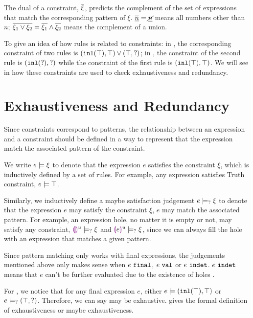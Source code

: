 \documentclass[acmsmall,screen,review,nonacm]{acmart}
\theoremstyle{slplain}
\numberwithin{thm}{section}
\begin{document}
The dual of a constraint, $\overline{\xi}$, predicts the complement of the set of expressions that match the corresponding pattern of $\xi$.
\eg $\overline{\underline{n}}=\underline{\cancel{n}}$ means all numbers other than $n$;
$\overline{\xi_1 \vee \xi_2}=\overline{\xi_1} \wedge \overline{\xi_2}$ means the complement of a union.

To give an idea of how rules is related to constraints:
in , the corresponding constraint of two rules is $(\mathtt{inl}(\top) , \top) \vee (\top , \mathtt{?})$;
in , the constraint of the second rule is $(\mathtt{inl}(\mathtt{?}) , \mathtt{?})$ while the constraint of the first rule is $(\mathtt{inl}(\top) , \top)$.
We will see in  how these constraints are used to check exhaustiveness and redundancy.

\section{Exhaustiveness and Redundancy}
\label{sec:exhaustiveness-redundancy}

Since constraints correspond to patterns, the relationship between an expression and a constraint should be defined in a way to represent that the expression match the associated pattern of the constraint.

We write $e \models \xi$ to denote that the expression $e$ satisfies the constraint $\xi$, which is inductively defined by a set of rules. For example, any expression satisfies Truth constraint, $e \models \top$.

Similarly, we inductively define a maybe satisfaction judgement $e \models_{?} \xi$ to denote that the expression $e$ may satisfy the constraint $\xi$, \ie $e$ may match the associated pattern. For example, an expression hole, no matter it is empty or not, may satisfy any constraint, \ie $\textcolor{violet}{\llparenthesis}\textcolor{violet}{\rrparenthesis}^{u} \models_{?} \xi$ and $\textcolor{violet}{\llparenthesis} e\textcolor{violet}{\rrparenthesis}^{u} \models_{?} \xi$, since we can always fill the hole with an expression that matches a given pattern.

Since pattern matching only works with final expressions, the judgements mentioned above only makes sense when $e ~\mathtt{final}$, \ie $e ~\mathtt{val}$ or $e ~\mathtt{indet}$. $e ~\mathtt{indet}$ means that $e$ can't be further evaluated due to the existence of holes \cite{DBLP:journals/pacmpl/OmarVCH19}.

For , we notice that for any final expression $e$, either 
$e \models (\mathtt{inl}(\top) , \top)$ or $e \models_{?} (\top , \mathtt{?})$.
Therefore, we can say  may be exhaustive.  gives the formal definition of exhaustiveness or maybe exhaustiveness.
\end{document}
